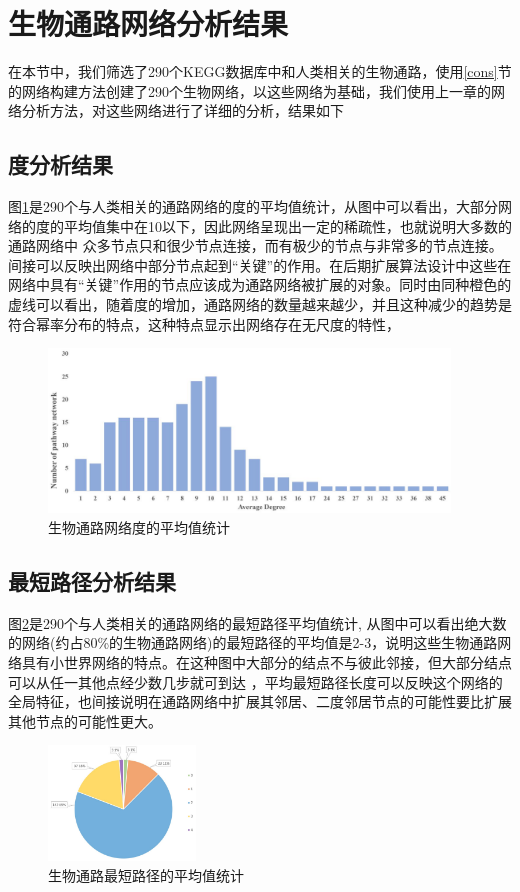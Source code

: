 \section{生物通路网络分析结果}
在本节中，我们筛选了290个KEGG\cite{kanehisa2008kegg}数据库中和人类相关的生物通路，使用\ref{cons}节的网络构建方法创建了290个生物网络，以这些网络为基础，我们使用上一章的网络分析方法，对这些网络进行了详细的分析，结果如下
\subsection{度分析结果}
图\ref{fig26}是290个与人类相关的通路网络的度的平均值统计，从图中可以看出，大部分网络的度的平均值集中在10以下，因此网络呈现出一定的稀疏性，也就说明大多数的通路网络中 众多节点只和很少节点连接，而有极少的节点与非常多的节点连接。间接可以反映出网络中部分节点起到“关键”的作用。在后期扩展算法设计中这些在网络中具有“关键”作用的节点应该成为通路网络被扩展的对象。同时由同种橙色的虚线可以看出，随着度的增加，通路网络的数量越来越少，并且这种减少的趋势是符合幂率分布的特点，这种特点显示出网络存在无尺度的特性，

\begin{figure}[h]
\centering
\includegraphics[width = 0.95\textwidth]{degree_dis}
\caption[fig26]{生物通路网络度的平均值统计}
\label{fig26}
\end{figure}

\subsection{最短路径分析结果}
图\ref{fig27}是290个与人类相关的通路网络的最短路径平均值统计, 从图中可以看出绝大数的网络(约占80\%的生物通路网络)的最短路径的平均值是2-3，说明这些生物通路网络具有小世界网络\cite{amaral2000classes}的特点。在这种图中大部分的结点不与彼此邻接，但大部分结点可以从任一其他点经少数几步就可到达 ，平均最短路径长度可以反映这个网络的全局特征，也间接说明在通路网络中扩展其邻居、二度邻居节点的可能性要比扩展其他节点的可能性更大。

\begin{figure}[h]
\centering
\includegraphics[width = 0.35\textwidth]{pie}
\caption[fig27]{生物通路最短路径的平均值统计}
\label{fig27}
\end{figure}


